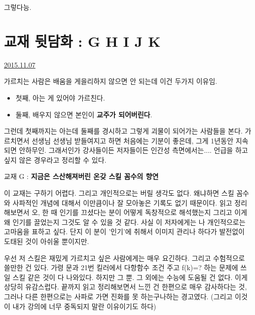 그렇다능.
\vspace{5mm}






\section{교재 뒷담화 : G H I J K}
\href{https://www.kockoc.com/Apoc/468220}{2015.11.07}

\vspace{5mm}

가르치는 사람은 배움을 게을리하지 않으면 안 되는데
이건 두가지 이유임.
\vspace{5mm}
\begin{itemize}
    \item 첫째, 아는 게 있어야 가르친다.
    \item 둘째, 배우지 않으면 본인이 \textbf{교주가 되어버린다}.
\end{itemize}
\vspace{5mm}

그런데 첫째까지는 아는데 둘째를 경시하고 그렇게 괴물이 되어가는 사람들을 본다.
가르치면서 선생님 선생님 받들여지고 하면 처음에는 기분이 좋은데, 그게 1년동안 지속되면 안하무인.
그래서인가 강사들이든 저자들이든 인간성 측면에서는.... 언급을 하고싶지 않은 경우라고 정리할 수 있다.
\vspace{5mm}

교재 G : \textbf{지금은 스산해져버린 온갖 스킬 꼼수의 향연}
\vspace{5mm}

이 교재는 구하기 어렵다. 그리고 개인적으로는 버릴 생각도 없다.
왜냐하면 스킬 꼼수와 사파적인 개념에 대해서 이만큼이나 잘 모아놓은 기록도 없기 때문이다.
읽고 정리해보면서 오, 한 때 인기를 끄셨다는 분이 어떻게 독창적으로 해석했는지 그리고 이게 왜 인기를 끌었는지 그것도 알 수 있을 것 같다.
사실 이 저자에게는 나 개인적으로는 고마움을 표하고 싶다. 단지 이 분이 '인기'에 취해서 이미지 관리나 하다가 발전없이 도태된 것이 아쉬울 뿐이지만.
\vspace{5mm}

우선 저 스킬은 재밌게 가르치고 싶은 사람에게는 매우 요긴하다.
그리고 수험적으로 쓸만한 건 있다. 가령 문과 21번 킬러에서 다항함수 조건 주고 f(k)=? 하는 문제에 쓰일 스킬 같은 것이 다 나와있다.
하지만 그 뿐. 그 외에는 수능에 도움될 건 없다. 이게 상당히 유감스럽다.
끝까지 읽고 정리해보면서 느낀 건 한편으로 매우 감사하다는 것, 그러나 다른 한편으로는 사파로 가면 진화를 못 하는구나하는 경고였다.
(그리고 이것이 내가 강의에 너무 중독되지 말란 이유이기도 하다)
\vspace{5mm}

